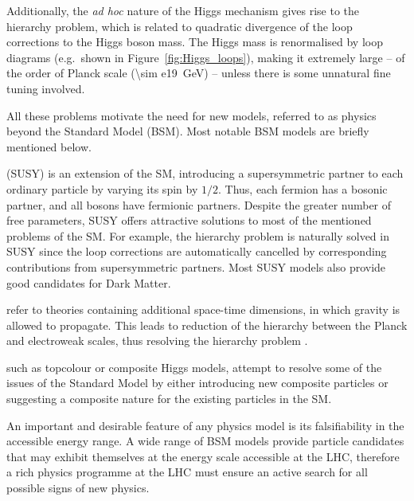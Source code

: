 Additionally, the \textit{ad hoc} nature of the Higgs mechanism gives rise to the hierarchy problem, which is related to
quadratic divergence of the loop corrections to the Higgs boson mass. The Higgs mass is renormalised by loop diagrams
(e.g.\ shown in Figure~\ref{fig:Higgs_loops}), making it extremely large  -- of the order of Planck scale (\SI{\sim
e19}{\GeV}) -- unless there is some unnatural fine tuning involved.



All these problems motivate the need for new models, referred to as physics beyond the Standard Model (BSM). Most
notable BSM models are briefly mentioned below.

\begin{description}[wide=\parindent]
\item [Supersymmetry] (SUSY) \autocite{SUSY_primer} is an extension of the SM, introducing a supersymmetric partner to
each ordinary particle by varying its spin by $1/2$. Thus, each fermion has a bosonic partner, and all bosons have
fermionic partners. Despite the greater number of free parameters, SUSY offers attractive solutions to most of the
mentioned problems of the SM. For example, the hierarchy problem is naturally solved in SUSY since the loop corrections
are automatically cancelled by corresponding contributions from supersymmetric partners. Most SUSY models also provide
good candidates for Dark Matter.
\item [Extra dimensions] refer to theories containing additional space-time dimensions, in which gravity is allowed to
propagate. This leads to reduction of the hierarchy between the Planck and electroweak scales, thus resolving the
hierarchy problem \autocite{Arkani-Hamed, RS}.
\item [Composite models,] such as topcolour \autocite{topcolour} or composite Higgs \autocite{composite_Higgs} models,
attempt to resolve some of the issues of the Standard Model by either introducing new composite particles or suggesting
a composite nature for the existing particles in the SM.
\end{description}

An important and desirable feature of any physics model is its falsifiability in the accessible energy range. A wide
range of BSM models provide particle candidates that may exhibit themselves at the energy scale accessible at the LHC,
therefore a rich physics programme at the LHC must ensure an active search for all possible signs of new physics.

